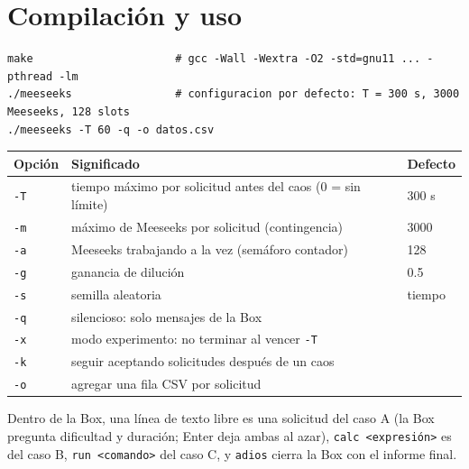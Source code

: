 \documentclass[11pt,letterpaper]{article}
\begin{document}
\begin{lstlisting}[style=salida]

\end{lstlisting}

\section{Compilación y uso}

\begin{lstlisting}[style=salida]
make                      # gcc -Wall -Wextra -O2 -std=gnu11 ... -pthread -lm
./meeseeks                # configuracion por defecto: T = 300 s, 3000 Meeseeks, 128 slots
./meeseeks -T 60 -q -o datos.csv
\end{lstlisting}

\begin{center}
\begin{tabular}{lp{10cm}l}
\toprule
Opción & Significado & Defecto \\
\midrule
\texttt{-T} & tiempo máximo por solicitud antes del caos (0 = sin límite) & 300 s \\
\texttt{-m} & máximo de Meeseeks por solicitud (contingencia) & 3000 \\
\texttt{-a} & Meeseeks trabajando a la vez (semáforo contador) & 128 \\
\texttt{-g} & ganancia de dilución & 0.5 \\
\texttt{-s} & semilla aleatoria & tiempo \\
\texttt{-q} & silencioso: solo mensajes de la Box & \\
\texttt{-x} & modo experimento: no terminar al vencer \texttt{-T} & \\
\texttt{-k} & seguir aceptando solicitudes después de un caos & \\
\texttt{-o} & agregar una fila CSV por solicitud & \\
\bottomrule
\end{tabular}
\end{center}

Dentro de la Box, una línea de texto libre es una solicitud del caso A (la Box pregunta
dificultad y duración; Enter deja ambas al azar), \texttt{calc <expresión>} es del caso B,
\texttt{run <comando>} del caso C, y \texttt{adios} cierra la Box con el informe final.


\end{document}
